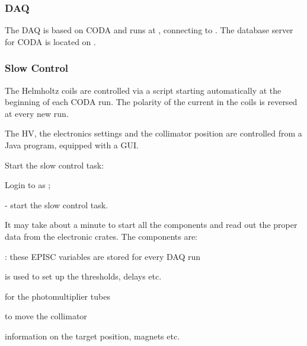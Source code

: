 {\subsubsection {DAQ}
\label{sec:moller_compon_daq}

The DAQ%
 is based on CODA\cite{CODAwww} and runs at ,
connecting to . The database server for CODA
is located on . 

\subsubsection {Slow Control}
\label{sec:moller_compon_slow}

The Helmholtz coils are controlled via a script starting automatically
at the beginning of each CODA run. The polarity of the current in the coils
is reversed at every new run.

The HV, the electronics settings and the collimator position
are controlled from a Java program, equipped with a GUI.

 Start the slow control task:
 \begin{list}{--}{\setlength{\itemsep}{-0.15cm}}
   \item Login to  as ;
   \item {}
   \item {} - start the slow control task.
 \end{list}
 It may take about a minute to start all the components and read out
 the proper data from the electronic crates.
 The components are: 
 \begin{list}{--}{\setlength{\itemsep}{-0.15cm}}
   \item {}: these EPISC variables are stored for every DAQ run
   \item {} is used to set up the thresholds, delays etc.
   \item {} for the photomultiplier tubes
   \item {} to move the collimator
   \item {} information on the target position, magnets etc.
 \end{list}
\infolevtwo{

}}
